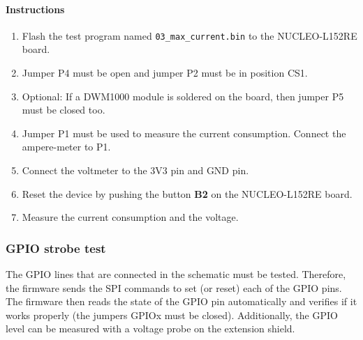 \documentclass[journal,comsoc]{IEEEtran}
\begin{document}
\paragraph{Instructions}
\begin{enumerate}
	\item Flash the test program named \texttt{03\_max\_current.bin} to the NUCLEO-L152RE board.
	\item Jumper P4 must be open and jumper P2 must be in position CS1.
	\item Optional: If a DWM1000 module is soldered on the board, then jumper P5 must be closed too.
	\item Jumper P1 must be used to measure the current consumption. Connect the ampere-meter to P1.
	\item Connect the voltmeter to the 3V3 pin and GND pin.
	\item Reset the device by pushing the button \textbf{B2} on the NUCLEO-L152RE board. %
	\item Measure the current consumption and the voltage.
\end{enumerate}

\vspace*{1em}
\subsubsection{GPIO strobe test}
The GPIO lines that are connected in the schematic must be tested. Therefore, the firmware sends the SPI commands to set (or reset) each of the GPIO pins. 
The firmware then reads the state of the GPIO pin automatically and verifies if it works properly (the jumpers GPIOx must be closed).
Additionally, the GPIO level can be measured with a voltage probe on the extension shield.
\end{document}
